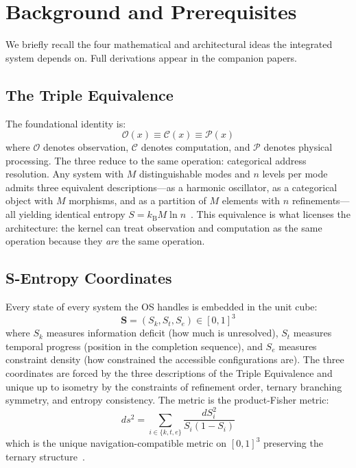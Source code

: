 \documentclass[11pt,twocolumn,a4paper]{article}
\newcommand{\Scoord}{\mathbf{S}}
\newcommand{\Skk}{S_k}
\newcommand{\Stt}{S_t}
\newcommand{\See}{S_e}
\newcommand{\kb}{k_{\mathrm{B}}}
\begin{document}
\section{Background and Prerequisites}
\label{sec:background}

We briefly recall the four mathematical and architectural ideas the integrated system depends on. Full derivations appear in the companion papers.

\subsection{The Triple Equivalence}

The foundational identity is:
\begin{equation}
\mathcal{O}(x) \equiv \mathcal{C}(x) \equiv \mathcal{P}(x)
\label{eq:triple}
\end{equation}
where $\mathcal{O}$ denotes observation, $\mathcal{C}$ denotes computation, and $\mathcal{P}$ denotes physical processing. The three reduce to the same operation: categorical address resolution. Any system with $M$ distinguishable modes and $n$ levels per mode admits three equivalent descriptions---as a harmonic oscillator, as a categorical object with $M$ morphisms, and as a partition of $M$ elements with $n$ refinements---all yielding identical entropy $S = \kb M \ln n$~\cite{shannon1948mathematical,jaynes1957information}. This equivalence is what licenses the architecture: the kernel can treat observation and computation as the same operation because they \emph{are} the same operation.

\subsection{S-Entropy Coordinates}

Every state of every system the OS handles is embedded in the unit cube:
\begin{equation}
\Scoord = (\Skk, \Stt, \See) \in [0,1]^3
\end{equation}
where $\Skk$ measures information deficit (how much is unresolved), $\Stt$ measures temporal progress (position in the completion sequence), and $\See$ measures constraint density (how constrained the accessible configurations are). The three coordinates are forced by the three descriptions of the Triple Equivalence and unique up to isometry by the constraints of refinement order, ternary branching symmetry, and entropy consistency. The metric is the product-Fisher metric:
\begin{equation}
ds^2 = \sum_{i \in \{k,t,e\}} \frac{dS_i^2}{S_i(1 - S_i)}
\label{eq:metric}
\end{equation}
which is the unique navigation-compatible metric on $[0,1]^3$ preserving the ternary structure~\cite{fisher1922mathematical,rao1945information,amari1985differential,chentsov1972statistical}.
\end{document}
